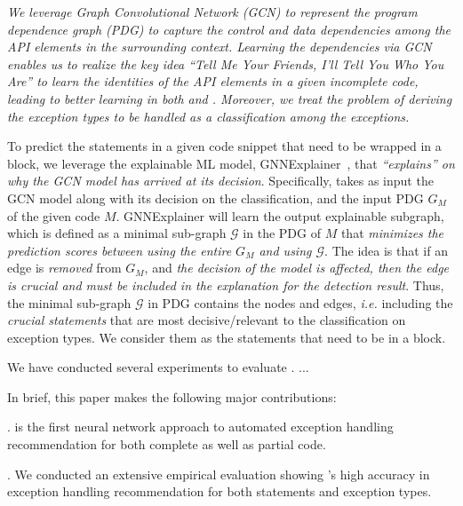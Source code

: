 {\em We leverage Graph Convolutional Network (GCN) to represent the
  program dependence graph (PDG) to capture the control and data
  dependencies among the API elements in the surrounding
  context. Learning the dependencies via GCN enables us to realize the
  key idea {\em ``Tell Me Your Friends, I'll Tell You Who You Are''}
  to learn the identities of the API elements in a given incomplete
  code, leading to better learning in both {\xstate} and
  {\xtype}. Moreover, we treat the problem of deriving the exception
  types to be handled as a classification among the exceptions.

To predict the statements in a given code snippet that need to be
wrapped in a  block, we leverage the explainable ML
model, GNNExplainer~\cite{GNNExplainer}, that {\em ``explains'' on why
  the GCN model has arrived at its decision}. Specifically, {\tool}
takes as input the GCN model along with its decision on the
classification, and the input PDG $G_M$ of the given code
$M$. GNNExplainer will learn the output explainable subgraph, which is
defined as a minimal sub-graph $\mathcal{G}$ in the PDG of $M$ that
{\em minimizes the prediction scores between using the entire $G_M$
  and using $\mathcal{G}$}. The idea is that if an edge is {\em
  removed} from $G_M$, and {\em the decision of the model is
  affected, then the edge is crucial and must be included in the
  explanation for the detection result}. Thus, the minimal sub-graph
$\mathcal{G}$ in PDG contains the nodes and edges, {\em i.e.}
including the {\em crucial statements} that are most decisive/relevant
to the classification on exception types. We consider them as the statements
that need to be in a  block.}

We have conducted several experiments to evaluate {\tool}. ...

In brief, this paper makes the following major contributions:

. {\tool} is the first neural network approach to
  automated exception handling recommendation for both complete as
  well as partial code.

. We conducted an extensive
empirical evaluation showing {\tool}'s high accuracy in exception
handling recommendation for both statements and exception types.

  
